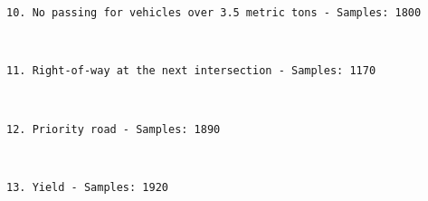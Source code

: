 \documentclass[11pt]{article}
\begin{document}
    \begin{Verbatim}[commandchars=\\\{\}]
10. No passing for vehicles over 3.5 metric tons - Samples: 1800

    \end{Verbatim}

    \begin{center}
    \end{center}
    { \hspace*{\fill} \\}
    
    \begin{Verbatim}[commandchars=\\\{\}]
11. Right-of-way at the next intersection - Samples: 1170

    \end{Verbatim}

    \begin{center}
    \end{center}
    { \hspace*{\fill} \\}
    
    \begin{Verbatim}[commandchars=\\\{\}]
12. Priority road - Samples: 1890

    \end{Verbatim}

    \begin{center}
    \end{center}
    { \hspace*{\fill} \\}
    
    \begin{Verbatim}[commandchars=\\\{\}]
13. Yield - Samples: 1920

    \end{Verbatim}

    \begin{center}
    \end{center}
    { \hspace*{\fill} \\}
    
\end{document}
